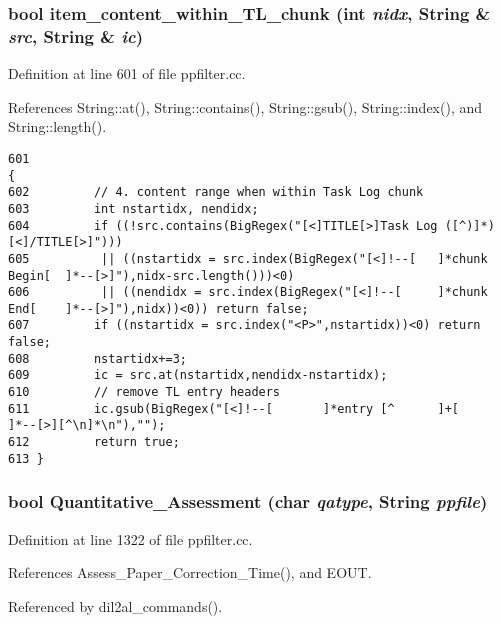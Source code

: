 \subsubsection{\setlength{\rightskip}{0pt plus 5cm}bool item\_\-content\_\-within\_\-TL\_\-chunk (int {\em nidx}, {\bf String} \& {\em src}, {\bf String} \& {\em ic})}\label{ppfilter_8cc_a12}




Definition at line 601 of file ppfilter.cc.

References String::at(), String::contains(), String::gsub(), String::index(), and String::length().



\footnotesize\begin{verbatim}601                                                                        {
602         // 4. content range when within Task Log chunk
603         int nstartidx, nendidx;
604         if ((!src.contains(BigRegex("[<]TITLE[>]Task Log ([^)]*)[<]/TITLE[>]")))
605          || ((nstartidx = src.index(BigRegex("[<]!--[   ]*chunk Begin[  ]*--[>]"),nidx-src.length()))<0)
606          || ((nendidx = src.index(BigRegex("[<]!--[     ]*chunk End[    ]*--[>]"),nidx))<0)) return false;
607         if ((nstartidx = src.index("<P>",nstartidx))<0) return false;
608         nstartidx+=3;
609         ic = src.at(nstartidx,nendidx-nstartidx);
610         // remove TL entry headers
611         ic.gsub(BigRegex("[<]!--[       ]*entry [^      ]+[     ]*--[>][^\n]*\n"),"");
612         return true;
613 }
\end{verbatim}\normalsize 
{}
\subsubsection{\setlength{\rightskip}{0pt plus 5cm}bool Quantitative\_\-Assessment (char {\em qatype}, {\bf String} {\em ppfile})}\label{ppfilter_8cc_a31}




Definition at line 1322 of file ppfilter.cc.

References Assess\_\-Paper\_\-Correction\_\-Time(), and EOUT.

Referenced by dil2al\_\-commands().



